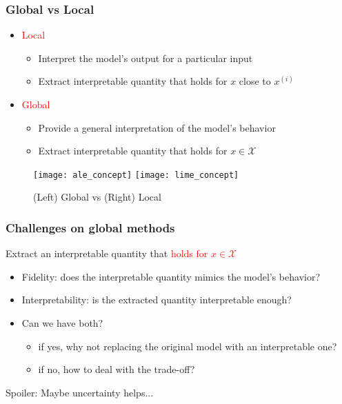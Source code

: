 \begin{frame}
  \frametitle{Global vs Local}
  \begin{itemize}
    \item \textcolor{red}{Local}
    \begin{itemize}
      \item Interpret the model's output for a particular input
      \item Extract interpretable quantity that holds for $x$ close to $x^{(i)}$
    \end{itemize}

    \item \textcolor{red}{Global}
    \begin{itemize}
      \item Provide a general interpretation of the model's behavior
      \item Extract interpretable quantity that holds for $x \in \mathcal{X}$
    \end{itemize}
  \end{itemize}

  \begin{figure}
    \centering
    \texttt{[image: ale\_concept]}
    \texttt{[image: lime\_concept]}
    \caption{(Left) Global vs (Right) Local}
  \end{figure}
\end{frame}


\begin{frame}
  \frametitle{Challenges on global methods}
  Extract an interpretable quantity that \textcolor{red}{holds for $x \in \mathcal{X}$}
  \begin{itemize}
    \item Fidelity: does the interpretable quantity mimics the model's behavior?
    \item Interpretability: is the extracted quantity interpretable enough?
    \item Can we have both?
    \begin{itemize}
      \item if yes, why not replacing the original model with an interpretable one?
      \item if no, how to deal with the trade-off?
    \end{itemize}
  \end{itemize}

  \noindent\makebox[\linewidth]{\rule{\paperwidth}{0.4pt}}
  Spoiler: Maybe uncertainty helps...
\end{frame}



